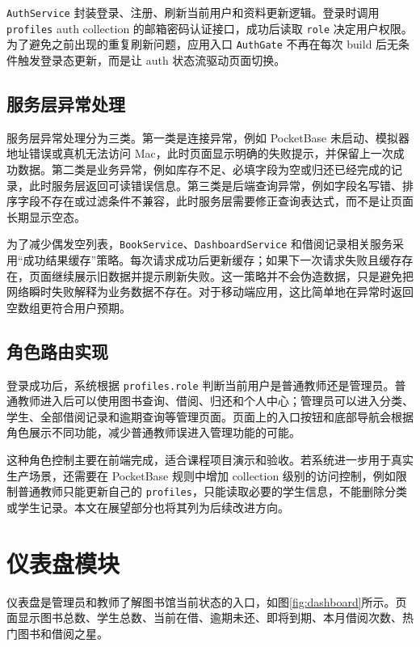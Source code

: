 \texttt{AuthService} 封装登录、注册、刷新当前用户和资料更新逻辑。登录时调用 \texttt{profiles} auth collection 的邮箱密码认证接口，成功后读取 \texttt{role} 决定用户权限。为了避免之前出现的重复刷新问题，应用入口 \texttt{AuthGate} 不再在每次 build 后无条件触发登录态更新，而是让 auth 状态流驱动页面切换。

\subsection{服务层异常处理}

服务层异常处理分为三类。第一类是连接异常，例如 PocketBase 未启动、模拟器地址错误或真机无法访问 Mac，此时页面显示明确的失败提示，并保留上一次成功数据。第二类是业务异常，例如库存不足、必填字段为空或归还已经完成的记录，此时服务层返回可读错误信息。第三类是后端查询异常，例如字段名写错、排序字段不存在或过滤条件不兼容，此时服务层需要修正查询表达式，而不是让页面长期显示空态。

为了减少偶发空列表，\texttt{BookService}、\texttt{DashboardService} 和借阅记录相关服务采用“成功结果缓存”策略。每次请求成功后更新缓存；如果下一次请求失败且缓存存在，页面继续展示旧数据并提示刷新失败。这一策略并不会伪造数据，只是避免把网络瞬时失败解释为业务数据不存在。对于移动端应用，这比简单地在异常时返回空数组更符合用户预期。

\subsection{角色路由实现}

登录成功后，系统根据 \texttt{profiles.role} 判断当前用户是普通教师还是管理员。普通教师进入后可以使用图书查询、借阅、归还和个人中心；管理员可以进入分类、学生、全部借阅记录和逾期查询等管理页面。页面上的入口按钮和底部导航会根据角色展示不同功能，减少普通教师误进入管理功能的可能。

这种角色控制主要在前端完成，适合课程项目演示和验收。若系统进一步用于真实生产场景，还需要在 PocketBase 规则中增加 collection 级别的访问控制，例如限制普通教师只能更新自己的 \texttt{profiles}，只能读取必要的学生信息，不能删除分类或学生记录。本文在展望部分也将其列为后续改进方向。

\section{仪表盘模块}

仪表盘是管理员和教师了解图书馆当前状态的入口，如图\ref{fig:dashboard}所示。页面显示图书总数、学生总数、当前在借、逾期未还、即将到期、本月借阅次数、热门图书和借阅之星。

